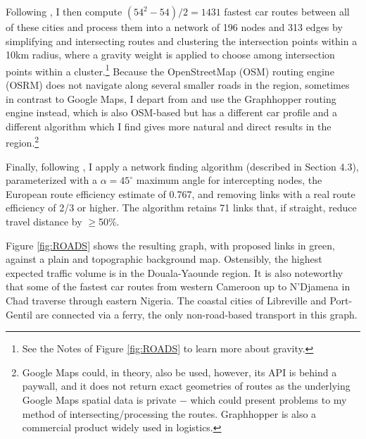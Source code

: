\documentclass[a4paper]{article}
\begin{document}
Following \citet{krantz2024optimal}, I then compute $(54^2-54)/2 = 1431$ fastest car routes between all of these cities and process them into a network of 196 nodes and 313 edges by simplifying and intersecting routes and clustering the intersection points within a 10km radius, where a gravity weight is applied to choose among intersection points within a cluster.\footnote{See the Notes of Figure \ref{fig:ROADS} to learn more about gravity.} Because the OpenStreetMap (OSM) routing engine (OSRM) does not navigate along several smaller roads in the region, sometimes in contrast to Google Maps, I depart from \citet{krantz2024optimal} and use the Graphhopper routing engine instead, which is also OSM-based but has a different car profile and a different algorithm which I find gives more natural and direct results in the region.\footnote{Google Maps could, in theory, also be used, however, its API is behind a paywall, and it does not return exact geometries of routes as the underlying Google Maps spatial data is private $-$ which could present problems to my method of intersecting/processing the routes. Graphhopper is also a commercial product widely used in logistics.}  \newline 

Finally, following \citet{krantz2024optimal}, I apply a network finding algorithm (described in \citet{krantz2024optimal} Section 4.3), parameterized with a $\alpha = 45^\circ$ maximum angle for intercepting nodes, the European route efficiency estimate of 0.767, and removing links with a real route efficiency of 2/3 or higher. The algorithm retains 71 links that, if straight, reduce travel distance by $\geq$50\%. \newline

Figure \ref{fig:ROADS} shows the resulting graph, with proposed links in green, against a plain and topographic background map. Ostensibly, the highest expected traffic volume is in the Douala-Yaounde region. It is also noteworthy that some of the fastest car routes from western Cameroon up to N'Djamena in Chad traverse through eastern Nigeria. The coastal cities of Libreville and Port-Gentil are connected via a ferry, the only non-road-based transport in this graph.  %
\end{document}

